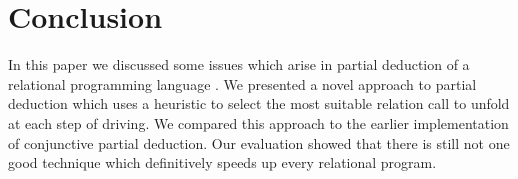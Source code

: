 \section{Conclusion}

In this paper we discussed some issues which arise in partial deduction of a relational programming language \mk{}.
We presented a novel approach to partial deduction which uses a heuristic to select the most suitable relation call to unfold at each step of driving.
We compared this approach to the earlier implementation of conjunctive partial deduction.
Our evaluation showed that there is still not one good technique which definitively speeds up every relational program.
